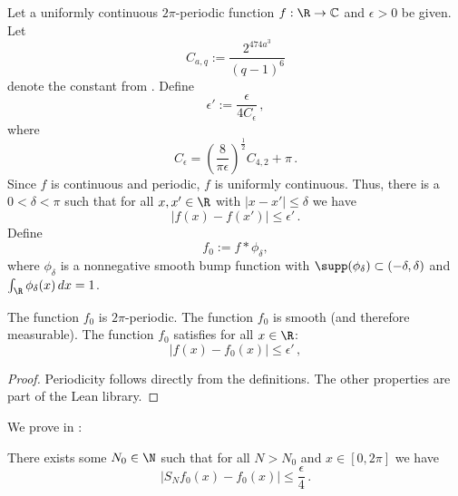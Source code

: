Let a uniformly continuous $2\pi$-periodic function $f:\R\to \mathbb{C}$ and $\epsilon>0$ be given.
Let
\begin{equation}
    C_{a,q} := \frac{2^{474a^3}}{(q-1)^6}
\end{equation}
denote the constant from .
Define
\begin{equation}
    \epsilon' := \frac {\epsilon} {4 C_\epsilon} \,,
\end{equation}
where
\begin{equation*}
    C_\epsilon = \left(\frac{8}{\pi\epsilon}\right)^\frac{1}{2} C_{4,2} + \pi \,.
\end{equation*}
Since $f$ is continuous and periodic, $f$ is uniformly continuous.
Thus, there is a $0<\delta<\pi$
such that for all $x,x' \in \R$ with $|x-x'|\le \delta$
we have
\begin{equation}\label{uniconbound}
|f(x)-f(x')|\le \epsilon' \, .
\end{equation}
Define
\begin{equation}\label{def-fzero}
f_0:=f \ast \phi_\delta,
\end{equation}
where $\phi_\delta$ is a nonnegative smooth bump function with $\supp (\phi_\delta) \subset (-\delta, \delta)$ and $\int _\R \phi_\delta (x) \, dx = 1$.

\begin{lemma}
\label{smooth-approximation}
\leanok
{}
    The function $f_0$ is $2\pi$-periodic.
    The function $f_0$ is smooth (and therefore measurable).
    The function $f_0$ satisfies for all $x\in \R$:
    \begin{equation}\label{eq-ffzero}
    |f(x)-f_0(x)|\le \epsilon' \, ,
    \end{equation}
\end{lemma}

\begin{proof}
    \leanok
    Periodicity follows directly from the definitions. The other properties are part of the Lean library.
\end{proof}

We prove in :
\begin{lemma}
\label{convergence-for-smooth}
\leanok
{}
    There exists some $N_0 \in \N$ such that for all $N>N_0$ and $x\in [0,2\pi]$ we have
    \begin{equation}
        |S_N f_0 (x)- f_0(x)|\le \frac \epsilon 4\, .
    \end{equation}
\end{lemma}

